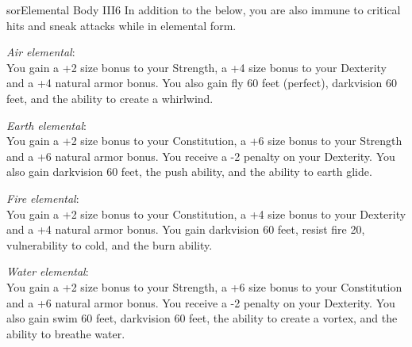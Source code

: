 \begin{spellcard}{sor}{Elemental Body III}{6}
  In addition to the below, you are also immune to critical hits and sneak attacks while in elemental form.

  \vfill{}
  \emph{Air elemental}:\\
  You gain a +2 size bonus to your Strength,
  a +4 size bonus to your Dexterity and a +4 natural armor bonus.
  You also gain fly 60 feet (perfect), darkvision 60 feet, and the ability to create a whirlwind.

  \emph{Earth elemental}:\\
  You gain a +2 size bonus to your Constitution,
  a +6 size bonus to your Strength and a +6 natural armor bonus.
  You receive a -2 penalty on your Dexterity.
  You also gain darkvision 60 feet, the push ability, and the ability to earth glide.

  \emph{Fire elemental}:\\
  You gain a +2 size bonus to your Constitution,
  a +4 size bonus to your Dexterity and a +4 natural armor bonus.
  You gain darkvision 60 feet, resist fire 20, vulnerability to cold, and the burn ability.

  \emph{Water elemental}:\\
  You gain a +2 size bonus to your Strength,
  a +6 size bonus to your Constitution and a +6 natural armor bonus.
  You receive a -2 penalty on your Dexterity.
  You also gain swim 60 feet, darkvision 60 feet, the ability to create a vortex, and the ability to breathe water.

\end{spellcard}
